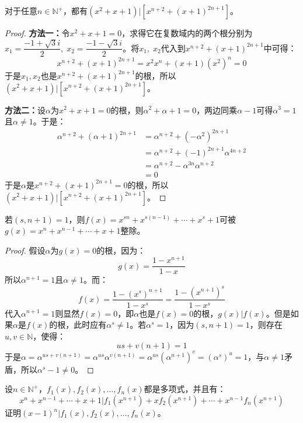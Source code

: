 \begin{theorem}
	对于任意$n\in\mathbb{N}^+$，都有$(x^2+x+1)\Big|[x^{n+2}+(x+1)^{2n+1}]$。
\end{theorem}
\begin{proof}
	\textbf{方法一：}令$x^2+x+1=0$，求得它在复数域内的两个根分别为$x_1=\dfrac{-1+\sqrt{3}i}{2},\;x_2=\dfrac{-1-\sqrt{3}i}{2}$。将$x_1,\;x_2$代入到$x^{n+2}+(x+1)^{2n+1}$中可得：
	\begin{equation*}
		x^{n+2}+(x+1)^{2n+1}=x^2x^n+(x+1)\left(x^2\right)^n=0
	\end{equation*}
	于是$x_1,x_2$也是$x^{n+2}+(x+1)^{2n+1}$的根，所以$(x^2+x+1)\Big|[x^{n+2}+(x+1)^{2n+1}]$。\par
	\textbf{方法二：}设$\alpha$为$x^2+x+1=0$的根，则$\alpha^2+\alpha+1=0$，两边同乘$\alpha-1$可得$\alpha^3=1$且$\alpha\ne1$。于是：
	\begin{align*}
		\alpha^{n+2}+(\alpha+1)^{2n+1}
		&=\alpha^{n+2}+(-\alpha^2)^{2n+1} \\
		&=\alpha^{n+2}+(-1)^{2n+1}\alpha^{4n+2} \\
		&=\alpha^{n+2}-\alpha^{3n}\alpha^{n+2} \\
		&=0
	\end{align*}
	于是$\alpha$是$x^{n+2}+(x+1)^{2n+1}=0$的根，所以$(x^2+x+1)\Big|[x^{n+2}+(x+1)^{2n+1}]$。
\end{proof}
\begin{theorem}
	若$(s,n+1)=1$，则$f(x)=x^{sn}+x^{s(n-1)}+\cdots+x^s+1$可被$g(x)=x^n+x^{n-1}+\cdots+x+1$整除。
\end{theorem}
\begin{proof}
	假设$\alpha$为$g(x)=0$的根，因为：
	\begin{equation*}
		g(x)=\frac{1-x^{n+1}}{1-x}
	\end{equation*}
	所以$\alpha^{n+1}=1$且$\alpha\ne1$。而：
	\begin{equation*}
		f(x)=\frac{1-(x^s)^{n+1}}{1-x^s}=\frac{1-(x^{n+1})^s}{1-x^s}
	\end{equation*}
	代入$\alpha^{n+1}=1$则显然$f(x)=0$，即$\alpha$也是$f(x)=0$的根，$g(x)|f(x)$。但是如果$\alpha$是$f(x)$的根，此时应有$\alpha^s\ne1$。若$\alpha^s=1$，因为$(s,n+1)=1$，则存在$u,v\in\mathbb{N}$，使得：
	\begin{equation*}
		us+v(n+1)=1
	\end{equation*}
	于是$\alpha=\alpha^{us+v(n+1)}=\alpha^{us}\alpha^{v(n+1)}=\alpha^{us}(\alpha^{n+1})^v=(\alpha^s)^u=1$，与$\alpha\ne1$矛盾，所以$\alpha^s-1\ne0$。
\end{proof}
\begin{theorem}
	设$n\in\mathbb{N}^+$，$f_1(x),f_2(x),\dots,f_n(x)$都是多项式，并且有：
	\begin{equation*}
		x^n+x^{n-1}+\cdots+x+1|f_1(x^{n+1})+xf_2(x^{n+1})+\cdots+x^{n-1}f_n(x^{n+1})
	\end{equation*}
	证明$(x-1)^n|f_1(x),f_2(x),\dots,f_n(x)$。
\end{theorem}
